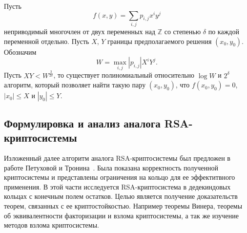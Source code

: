\documentclass[_00_dissertation.tex]{subfiles}
\begin{document}


\begin{statement}\label{statement:coppersmith}
  Пусть
  \begin{equation*}
      f(x, y) = \sum\limits_{i, j} p_{i, j} x^i y^j
  \end{equation*}
  неприводимый многочлен от двух переменных над $\mathbb{Z}$ со степенью $\delta$ по каждой переменной отдельно.
  Пусть $X$, $Y$ границы предполагаемого решения $(x_0, y_0)$.
  Обозначим
  \begin{equation*}
      W = \max_{i, j} |p_{i, j}| X^i Y^j.
  \end{equation*}
  Пусть $XY < W^{\frac{3}{2\delta}}$, то существует полиномиальный относительно $\log W$ и $2^\delta$ алгоритм, который позволяет найти такую пару $(x_0, y_0)$, что $f(x_0, y_0) = 0$, $|x_0| \le X$ и $|y_0| \le Y$.
\end{statement}

\subsection{Формулировка и анализ аналога RSA-криптосистемы}

Изложенный далее алгоритм аналога RSA-криптосистемы был предложен в работе Петуховой и Тронина~\cite{source:Petukhova}.
Была показана корректность полученной криптосистемы и представлены ограничения  на кольцо для ее эффектитвного применения.
В этой части исследуется RSA-криптосистема в дедекиндовых кольцах с конечным полем остатков.
Целью является получение доказательств теорем, связанных с ее криптостойкостью.
Например теоремы Винера, теоремы об эквивалентности факторизации и взлома криптосистемы, а так же изучение методов взлома криптосистемы.
\end{document}
